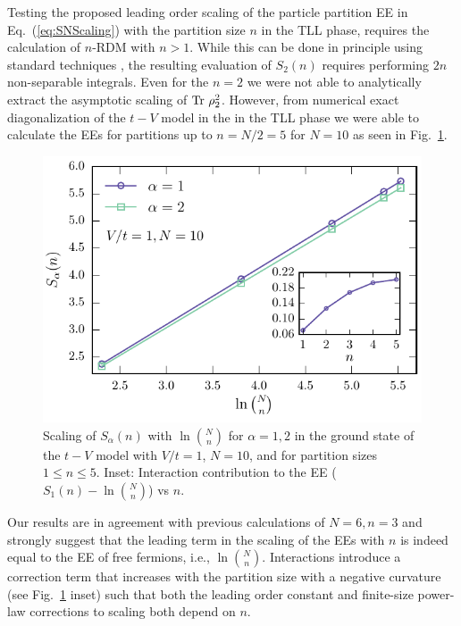 Testing the proposed leading order scaling of the particle partition
EE in Eq.~(\ref{eq:SNScaling}) with the partition size $n$ in the TLL phase,
requires the calculation of $n$-RDM with $n>1$.  While this can be done in
principle using standard techniques \cite{giamarchi:2004qu}, the resulting
evaluation of $S_2(n)$ requires performing $2n$ non-separable integrals.  Even
for the $n=2$ we were not able to analytically extract the asymptotic scaling
of $\rm{Tr}\ \rho_2^2$.  However, from numerical exact diagonalization of the
$t-V$ model in the in the TLL phase we were able to calculate
the \ren EEs for partitions up to $n=N/2=5$ for $N=10$ 
as seen in Fig.~\ref{fig:SvsNchoosen}. 
%
\begin{figure}[h]
\begin{center}
\includegraphics[width=0.7\columnwidth]{Chapters/SvsN_choose_N.pdf}
\end{center}
\caption{Scaling of $S_\alpha(n)$ with $\ln \binom{N}{n}$ for $\alpha=1,2$ in
the ground state of the $t-V$ model with $V/t=1$, $N=10$, and for partition
sizes $1 \leq n \leq 5$.  Inset: Interaction  contribution to the EE
($S_1(n)-\ln \binom{N}{n}$) vs $n$.} 
\label{fig:SvsNchoosen}
 \end{figure}
%
Our results are in agreement with previous calculations of $N=6,n=3$
\cite{Zozulya:2008kb} and strongly suggest that the leading term in the scaling
of the \ren EEs with $n$ is indeed equal to the \ren EE of free fermions, i.e.,
$\ln \binom{N}{n}$.  Interactions introduce a correction term that increases
with the partition size with a negative curvature (see Fig.~\ref{fig:SvsNchoosen}
inset) such that both the leading order constant and finite-size power-law
corrections to scaling both depend on $n$.

